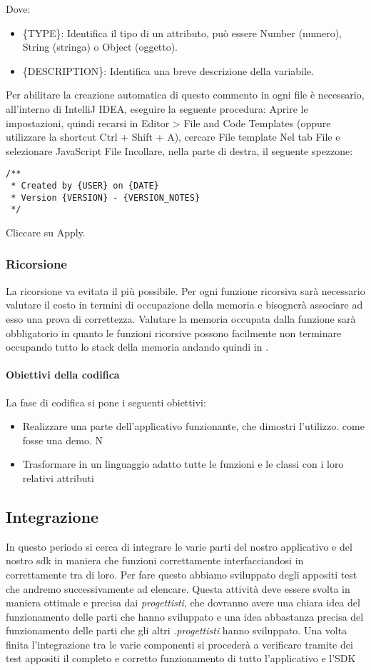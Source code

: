 Dove:
\begin{itemize}
\item \{TYPE\}: Identifica il tipo di un attributo, può essere Number (numero), String (stringa) o Object (oggetto).
\item \{DESCRIPTION\}: Identifica una breve descrizione della variabile.
\end{itemize}


Per abilitare la creazione automatica di questo commento in ogni file è necessario, all'interno di IntelliJ IDEA, eseguire la seguente procedura:
Aprire le impostazioni, quindi recarsi in Editor > File and Code Templates (oppure  utilizzare la shortcut Ctrl + Shift + A), cercare File template
Nel tab File e selezionare JavaScript File
Incollare, nella parte di destra, il seguente spezzone:
\begin{lstlisting}
/**
 * Created by {USER} on {DATE}
 * Version {VERSION} - {VERSION_NOTES}
 */
\end{lstlisting}
Cliccare su Apply.
  
\subsubsection{Ricorsione}
La ricorsione va evitata il più possibile. Per ogni funzione ricorsiva sarà necessario valutare il costo in termini di occupazione della memoria e bisognerà associare ad esso una prova di correttezza.
Valutare la memoria occupata dalla funzione sarà obbligatorio in quanto le funzioni ricorsive possono facilmente non terminare occupando tutto lo stack della memoria andando quindi in .

\paragraph{Obiettivi della codifica}
La fase di codifica si pone i seguenti obiettivi:
\begin{itemize}
\item Realizzare una parte dell'applicativo funzionante, che dimostri l'utilizzo. come fosse una demo. N
\item Trasformare in un linguaggio adatto tutte le funzioni e le classi con i loro relativi attributi 
\end{itemize}

\subsection{Integrazione}
In questo periodo si cerca di integrare le varie parti del nostro applicativo e del nostro sdk in maniera che funzioni correttamente interfacciandosi in  correttamente tra di loro. Per fare questo abbiamo sviluppato degli appositi test che andremo successivamente ad elencare.
Questa attività deve essere svolta in maniera ottimale e precisa dai \textit{progettisti}, che dovranno avere una chiara idea del funzionamento delle parti che hanno sviluppato e una idea abbastanza precisa del funzionamento delle parti che gli altri .\textit{progettisti} hanno sviluppato. Una volta finita l'integrazione tra le varie componenti si procederà a verificare tramite dei test appositi il completo e corretto funzionamento di tutto l'applicativo e l'SDK

